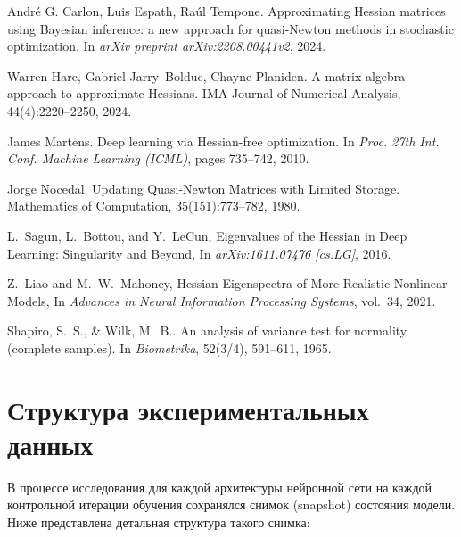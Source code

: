 \documentclass[a4paper,12pt]{article}
\begin{document}
\begin{thebibliography}{99}
  André G. Carlon, Luis Espath, Raúl Tempone.
  \newblock Approximating Hessian matrices using Bayesian inference: a new approach for quasi-Newton methods
  in stochastic optimization.
  \newblock In \emph{arXiv preprint arXiv:2208.00441v2}, 2024.

  Warren Hare, Gabriel Jarry–Bolduc, Chayne Planiden.
  \newblock A matrix algebra approach to approximate Hessians.
  \newblock IMA Journal of Numerical Analysis, 44(4):2220–2250, 2024.

  James Martens.
  \newblock Deep learning via Hessian-free optimization.
  \newblock In {\em Proc. 27th Int. Conf. Machine Learning (ICML)}, pages 735–742, 2010.

  Jorge Nocedal.
  \newblock Updating Quasi-Newton Matrices with Limited Storage.
  \newblock Mathematics of Computation, 35(151):773–782, 1980.

  L.~Sagun, L.~Bottou, and Y.~LeCun,
  \newblock Eigenvalues of the Hessian in Deep Learning: Singularity and Beyond,
  \newblock In \emph{arXiv:1611.07476 [cs.LG]}, 2016.

  Z.~Liao and M.~W.~Mahoney,
  \newblock Hessian Eigenspectra of More Realistic Nonlinear Models,
  \newblock In \emph{Advances in Neural Information Processing Systems}, vol.~34, 2021.

  Shapiro, S.~S., \& Wilk, M.~B..
  \newblock An analysis of variance test for normality (complete samples).
  \newblock In \emph{Biometrika}, 52(3/4), 591–611, 1965.

\end{thebibliography}

\newpage

\appendix
{}

\section{Структура экспериментальных данных}

В процессе исследования для каждой архитектуры нейронной сети на каждой контрольной итерации обучения
сохранялся снимок (snapshot) состояния модели. Ниже представлена детальная структура такого снимка:
\end{document}
